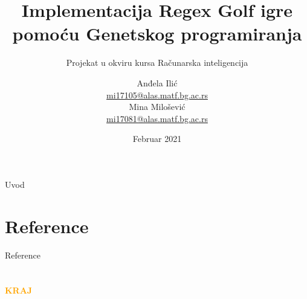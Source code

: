 \documentclass[aspectratio=43]{beamer}
\title[Regex Golf]{Implementacija Regex Golf igre pomoću Genetskog programiranja}
\subtitle{Projekat u okviru kursa Računarska inteligencija}
\author[Anđela Ilić, Mina Milošević]{Anđela Ilić \\
\href{mailto:mi17105@alas.matf.bg.ac.rs}{mi17105@alas.matf.bg.ac.rs} \\
Mina Milošević \\
\href{mailto:mi17081@alas.matf.bg.ac.rs}{mi17081@alas.matf.bg.ac.rs} 
}
\institute[MATF]{
    Matematički fakultet%
    \\%
    Univerzitet u Beogradu%
}
\date[Februar 2021]{Februar 2021}
\begin{document}
    
    \frame{\titlepage}
    
    \begin{frame}{Uvod}
        \tableofcontents
    \end{frame}

     
    
    
    
    \section*{Reference} 
        \nocite{Bartoli}
        \nocite{Examples}
        \nocite{Solutions}
        \nocite{Presidents}
        \nocite{Movies}
        \nocite{Regions}
        \begin{frame}{Reference}
            \printbibliography
        \end{frame}

    \section{}
    \begin{frame}{}
        \centering
            \Huge\bfseries
        \textcolor{orange}{KRAJ}
    \end{frame}
\end{document}
